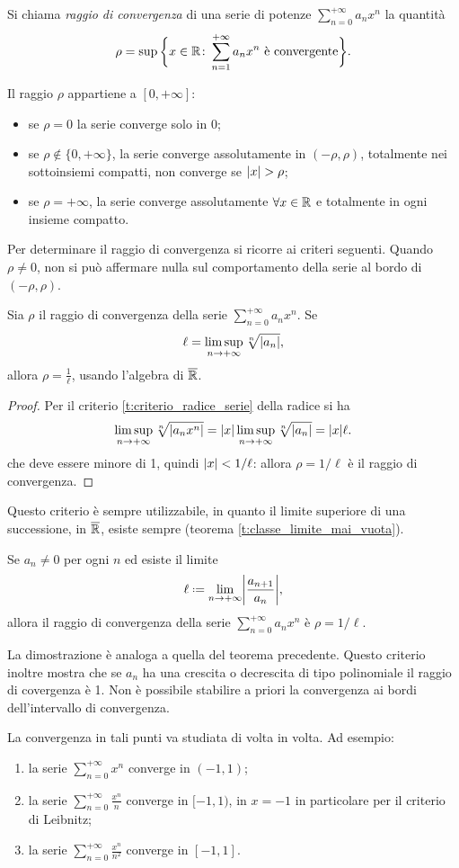 \begin{definizione}
Si chiama \emph{raggio di convergenza} di una serie di potenze $\sum_{n=0}^{+\infty}a_nx^n$ la quantità
\[
\rho=\sup\bigg\{x\in\mathbb{R}\colon\sum_{n=1}^{+\infty}a_nx^n\text{ è convergente}\bigg\}.
\]
\end{definizione}
Il raggio $\rho$ appartiene a $[0,+\infty]$:
\begin{itemize}
\item se $\rho=0$ la serie converge solo in 0;
\item se $\rho\notin\{0,+\infty\}$, la serie converge assolutamente in $(-\rho,\rho)$, totalmente nei sottoinsiemi compatti, non converge se $\lvert x\rvert>\rho$;
\item se $\rho=+\infty$, la serie converge assolutamente $\forall x\in\mathbb{R}$ e totalmente in ogni insieme compatto.
\end{itemize}
Per determinare il raggio di convergenza si ricorre ai criteri seguenti.
Quando $\rho\neq 0$, non si può affermare nulla sul comportamento della serie al bordo di $(-\rho,\rho)$.
\begin{teorema}
Sia $\rho$ il raggio di convergenza della serie $\sum_{n=0}^{+\infty}a_nx^n$. Se
\[
\ell=\limsup_{n\to+\infty}\sqrt[n]{\lvert a_n\rvert},
\]
allora $\rho=\frac1{\ell}$, usando l'algebra di $\overline{\mathbb{R}}$.
\end{teorema}
\begin{proof}
Per il criterio \ref{t:criterio_radice_serie} della radice si ha
\[
\limsup_{n\to+\infty}\sqrt[n]{\lvert a_nx^n\rvert}=\lvert x\rvert\limsup_{n\to+\infty}\sqrt[n]{\lvert a_n\rvert}=\lvert x\rvert\ell.
\]
che deve essere minore di 1, quindi $\lvert x\rvert<1/\ell$: allora $\rho=1/\ell$ è il raggio di convergenza.
\end{proof}
Questo criterio è sempre utilizzabile, in quanto il limite superiore di una successione, in $\overline{\mathbb{R}}$, esiste sempre (teorema \ref{t:classe_limite_mai_vuota}).
\begin{teorema}[d'Alembert]
Se $a_n\neq 0$ per ogni $n$ ed esiste il limite
\[
	\ell\defeq\lim_{n\to+\infty}\abs[\bigg]{\frac{a_{n+1}}{a_n}},
\]
allora il raggio di convergenza della serie $\sum_{n=0}^{+\infty}a_nx^n$ è $\rho=1/\ell$.
\end{teorema}
La dimostrazione è analoga a quella del teorema precedente. Questo criterio inoltre mostra che se $a_n$ ha una crescita o decrescita di tipo polinomiale il raggio di covergenza è 1.
Non è possibile stabilire a priori la convergenza ai bordi dell'intervallo di convergenza.
\begin{esempio} \label{es:convergenza-serie-di-potenza-sul-bordo}
	La convergenza in tali punti va studiata di volta in volta. Ad esempio:
	\begin{enumerate}
		\item la serie $\sum_{n=0}^{+\infty}x^n$ converge in $(-1,1)$;
		\item la serie $\sum_{n=0}^{+\infty}\frac{x^n}{n}$ converge in $[-1,1)$, in $x=-1$ in particolare per il criterio di Leibnitz;
		\item la serie $\sum_{n=0}^{+\infty}\frac{x^n}{n^2}$ converge in $[-1,1]$.
	\end{enumerate}
\end{esempio}

